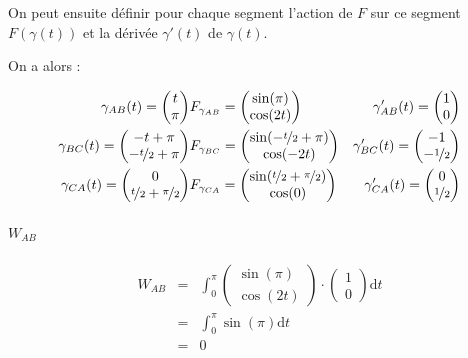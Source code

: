 \documentclass[a4paper, 11pt]{report} %
\newcommand{\dt}{\mathrm{d}t}
\begin{document}
On peut ensuite définir pour chaque segment l'action de $F$ sur ce segment $F(\gamma(t))$ et la dérivée $\gamma'(t)$ de
$\gamma(t)$.

On a alors :

\begin{eqnarray*}
\gamma_{AB}(t) =
\begin{pmatrix}
t\\
\pi
\end{pmatrix} &
F_{\gamma_{AB}} = 
\begin{pmatrix}
\sin(\pi)\\
\cos(2t)
\end{pmatrix} &
\gamma'_{AB}(t) =
\begin{pmatrix}
1\\
0
\end{pmatrix}\\ %
\gamma_{BC}(t) =
\begin{pmatrix}
-t+\pi\\
-\nicefrac{t}{2}+\pi
\end{pmatrix} &
F_{\gamma_{BC}} = 
\begin{pmatrix}
\sin(-\nicefrac{t}{2}+\pi)\\
\cos(-2t)
\end{pmatrix} &
\gamma'_{BC}(t) =
\begin{pmatrix}
-1\\
-\nicefrac{1}{2}
\end{pmatrix}\\ %
\gamma_{CA}(t) =
\begin{pmatrix}
0\\
\nicefrac{t}{2} +\nicefrac{\pi}{2}
\end{pmatrix} &
F_{\gamma_{CA}} = 
\begin{pmatrix}
\sin(\nicefrac{t}{2} +\nicefrac{\pi}{2})\\
\cos(0)
\end{pmatrix} &
\gamma'_{CA}(t) =
\begin{pmatrix}
0\\
\nicefrac{1}{2}
\end{pmatrix}
\end{eqnarray*}

\paragraph{$W_{AB}$}

\begin{eqnarray*}
W_{AB} & = &
\int_0^\pi
\begin{pmatrix}
\sin(\pi)\\
\cos(2t)
\end{pmatrix}
\cdot
\begin{pmatrix}
1\\
0
\end{pmatrix}
\dt\\
& = & \int_0^\pi\sin(\pi)\dt\\
& = & 0
\end{eqnarray*}
\end{document}

